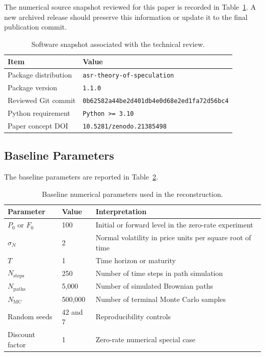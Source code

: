 \documentclass[11pt,a4paper]{article}
\newcommand{\ConceptDOI}{10.5281/zenodo.21385498}
\newcommand{\SoftwareVersion}{1.1.0}
\newcommand{\ReviewedCommit}{0b62582a44be2d401db4e0d68e2ed1fa72d56bc4}
\begin{document}
The numerical source snapshot reviewed for this paper is recorded in Table~\ref{tab:software-snapshot}. A new archived release should preserve this information or update it to the final publication commit.

\begin{table}[htbp]
\centering
\caption{Software snapshot associated with the technical review.}
\label{tab:software-snapshot}
\begin{tabular}{ll}
\toprule
Item & Value \\
\midrule
Package distribution & \texttt{asr-theory-of-speculation} \\
Package version & \texttt{\SoftwareVersion} \\
Reviewed Git commit & \texttt{\ReviewedCommit} \\
Python requirement & \texttt{Python >= 3.10} \\
Paper concept DOI & \texttt{\ConceptDOI} \\
\bottomrule
\end{tabular}
\end{table}

\subsection{Baseline Parameters}

The baseline parameters are reported in Table~\ref{tab:parameters}.

\begin{table}[htbp]
\centering
\caption{Baseline numerical parameters used in the reconstruction.}
\label{tab:parameters}
\begin{tabular}{lll}
\toprule
Parameter & Value & Interpretation \\
\midrule
\(P_0\) or \(F_0\) & 100 & Initial or forward level in the zero-rate experiment \\
\(\sigma_N\) & 2 & Normal volatility in price units per square root of time \\
\(T\) & 1 & Time horizon or maturity \\
\(N_{\mathrm{steps}}\) & 250 & Number of time steps in path simulation \\
\(N_{\mathrm{paths}}\) & 5,000 & Number of simulated Brownian paths \\
\(N_{\mathrm{MC}}\) & 500,000 & Number of terminal Monte Carlo samples \\
Random seeds & 42 and 7 & Reproducibility controls \\
Discount factor & 1 & Zero-rate numerical special case \\
\bottomrule
\end{tabular}
\end{table}
\end{document}
